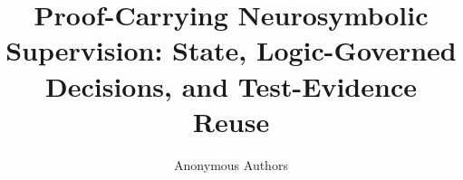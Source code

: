 \documentclass{article}
\title{Proof-Carrying Neurosymbolic Supervision: State, Logic-Governed Decisions, and Test-Evidence Reuse}
\author{Anonymous Authors}
\begin{document}
\maketitle
\begin{abstract}

\end{abstract}

\end{document}
